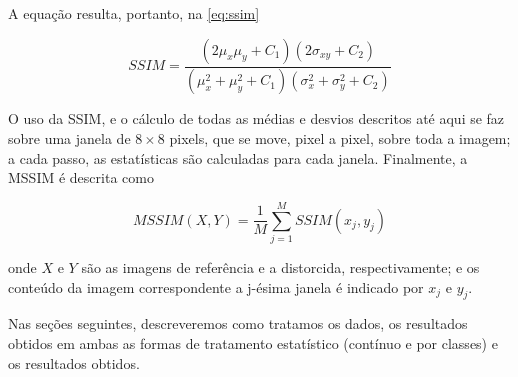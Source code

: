 A equação resulta, portanto, na \autoref*{eq:ssim}

\begin{equation}\label{eq:ssim}
	SSIM = \frac{(2\mu_x\mu_y + C_1)(2\sigma_{xy} + C_2)}{(\mu^{2}_{x} + \mu^{2}_{y} + C_1)(\sigma^{2}_{x} + \sigma^{2}_{y} + C_2)}
\end{equation}

O uso da SSIM, e o cálculo de todas as médias e desvios descritos até aqui se faz sobre uma janela de $8\times8$ pixels, que se move, pixel a pixel, sobre toda a imagem; a cada passo, as estatísticas são calculadas para cada janela. Finalmente, a MSSIM é descrita como

\begin{equation}\label{eq:mssim}
	MSSIM(X,Y) = \frac{1}{M}\sum^{M}_{j=1}SSIM(x_j,y_j)
\end{equation}

onde $X$ e $Y$ são as imagens de referência e a distorcida, respectivamente; e os conteúdo da imagem correspondente a j-ésima janela é indicado por $x_j$ e $y_j$.

Nas seções seguintes, descreveremos como tratamos os dados, os resultados obtidos em ambas as formas de tratamento estatístico (contínuo e por classes) e os resultados obtidos.


